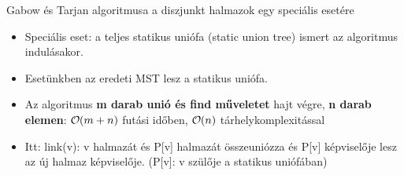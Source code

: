 \begin{frame}{Gabow és Tarjan algoritmusa a diszjunkt halmazok egy speciális esetére}
  \small
  \begin{itemize}
    \item Speciális eset: a teljes statikus uniófa (static union tree) ismert az algoritmus indulásakor. %
    \item Esetünkben az eredeti MST lesz a statikus uniófa.
    \item Az algoritmus \textbf{m darab unió és find műveletet} hajt végre, \textbf{n darab elemen}: $ \bigO (m + n)$ futási időben, $ \bigO (n)$ tárhelykomplexitással
    \item Itt: link(v): v halmazát és P[v] halmazát összeuniózza és P[v] képviselője lesz az új halmaz képviselője. (P[v]: v szülője a statikus uniófában)
  \end{itemize}
\end{frame}
